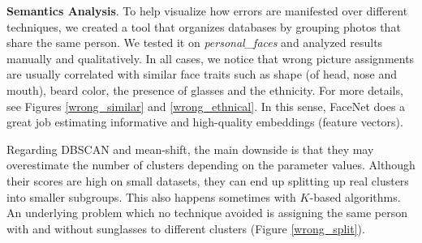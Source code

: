 \documentclass[conference]{IEEEtran}
\begin{document}
\textbf{Semantics Analysis}. To help visualize how errors are manifested over different techniques, we created a tool that organizes databases by grouping photos that share the same person.
We tested it on \textit{personal\_faces} and analyzed results manually and qualitatively.
In all cases, we notice that wrong picture assignments are usually correlated with similar face traits such as shape (of head, nose and mouth), beard color, the presence of glasses and the ethnicity.
For more details, see Figures \ref{wrong_similar} and \ref{wrong_ethnical}.
In this sense, FaceNet does a great job estimating informative and high-quality embeddings (feature vectors).

Regarding DBSCAN and mean-shift, the main downside is that they may overestimate the number of clusters depending on the parameter values.
Although their scores are high on small datasets, they can end up splitting up real clusters into smaller subgroups.
This also happens sometimes with $K$-based algorithms.
An underlying problem which no technique avoided is assigning the same person with and without sunglasses to different clusters (Figure \ref{wrong_split}).
\end{document}
